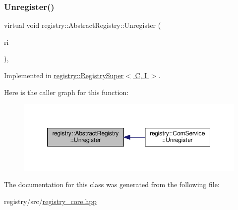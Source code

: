 \subsubsection{\texorpdfstring{Unregister()}{Unregister()}}
{\footnotesize\ttfamily virtual void registry\+::\+Abstract\+Registry\+::\+Unregister (\begin{DoxyParamCaption}\item[{\hyperlink{classregistry_1_1RegItem}{Reg\+Item}}]{ri }\end{DoxyParamCaption})\hspace{0.3cm}{\ttfamily [pure virtual]}, {\ttfamily [noexcept]}}



Implemented in \hyperlink{classregistry_1_1RegistrySuper_a3d35e055e1e69a00074701356e3e700f}{registry\+::\+Registry\+Super$<$ C, I $>$}.

Here is the caller graph for this function\+:\nopagebreak
\begin{figure}[H]
\begin{center}
\leavevmode
\includegraphics[width=350pt]{classregistry_1_1AbstractRegistry_ac5bb3b6a75a63a474f6b0afb31ea51c1_icgraph}
\end{center}
\end{figure}


The documentation for this class was generated from the following file\+:\begin{DoxyCompactItemize}
\item 
registry/src/\hyperlink{registry__core_8hpp}{registry\+\_\+core.\+hpp}\end{DoxyCompactItemize}
